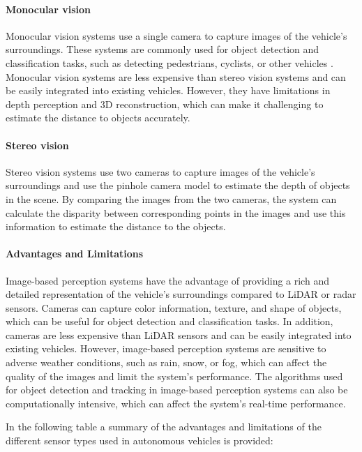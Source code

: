 \paragraph{Monocular vision} Monocular vision systems use a single camera to capture images of the vehicle's surroundings. 
These systems are commonly used for object detection and classification tasks, such as detecting pedestrians, cyclists, or other vehicles \cite{autonomous_vehicles_perception_survey}. 
Monocular vision systems are less expensive than stereo vision systems and can be easily integrated into existing vehicles. 
However, they have limitations in depth perception and 3D reconstruction, which can make it 
challenging to estimate the distance to objects accurately. 

\paragraph{Stereo vision} Stereo vision systems use two cameras to capture images of the vehicle's surroundings and
use the pinhole camera model \cite{pin_hole_camera_model} to estimate the depth of objects in the scene. By comparing the images from the two cameras,
the system can calculate the disparity between corresponding points in the images and use this information to estimate the
distance to the objects.
\paragraph{Advantages and Limitations} Image-based perception systems have the advantage of providing a rich and 
detailed representation of the vehicle's surroundings compared to LiDAR or radar sensors. Cameras can capture color information,
texture, and shape of objects, which can be useful for object detection and classification tasks. In addition, cameras are less
expensive than LiDAR sensors and can be easily integrated into existing vehicles. However, image-based perception systems are
sensitive to adverse weather conditions, such as rain, snow, or fog, which can affect the quality of the images and limit the system's performance. 
The algorithms used for object detection and tracking in image-based perception systems can also be computationally intensive, which can
affect the system's real-time performance.

In the following table a summary of the advantages and limitations of the different sensor types used in autonomous vehicles is provided:

